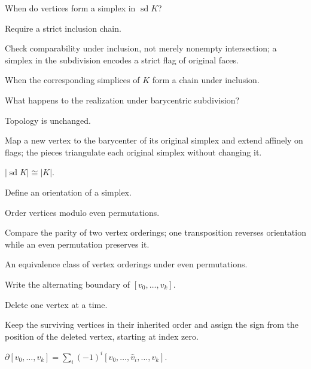 \begin{exercise}\label{exr:viii15-17}
When do vertices form a simplex in \(\operatorname{sd}K\)?
\end{exercise}
\begin{hint}
Require a strict inclusion chain.

Check comparability under inclusion, not merely nonempty intersection; a simplex in the subdivision encodes a strict flag of original faces.
\end{hint}
\begin{solution}
When the corresponding simplices of \(K\) form a chain under inclusion.
\end{solution}

\begin{exercise}\label{exr:viii15-18}
What happens to the realization under barycentric subdivision?
\end{exercise}
\begin{hint}
Topology is unchanged.

Map a new vertex to the barycenter of its original simplex and extend affinely on flags; the pieces triangulate each original simplex without changing it.
\end{hint}
\begin{solution}
\(|\operatorname{sd}K|\cong|K|\).
\end{solution}

\begin{exercise}\label{exr:viii15-19}
Define an orientation of a simplex.
\end{exercise}
\begin{hint}
Order vertices modulo even permutations.

Compare the parity of two vertex orderings; one transposition reverses orientation while an even permutation preserves it.
\end{hint}
\begin{solution}
An equivalence class of vertex orderings under even permutations.
\end{solution}

\begin{exercise}\label{exr:viii15-20}
Write the alternating boundary of \([v_0,\dots,v_k]\).
\end{exercise}
\begin{hint}
Delete one vertex at a time.

Keep the surviving vertices in their inherited order and assign the sign from the position of the deleted vertex, starting at index zero.
\end{hint}
\begin{solution}
\(\partial[v_0,\dots,v_k]=\sum_i(-1)^i[v_0,\dots,\widehat v_i,\dots,v_k]\).
\end{solution}


